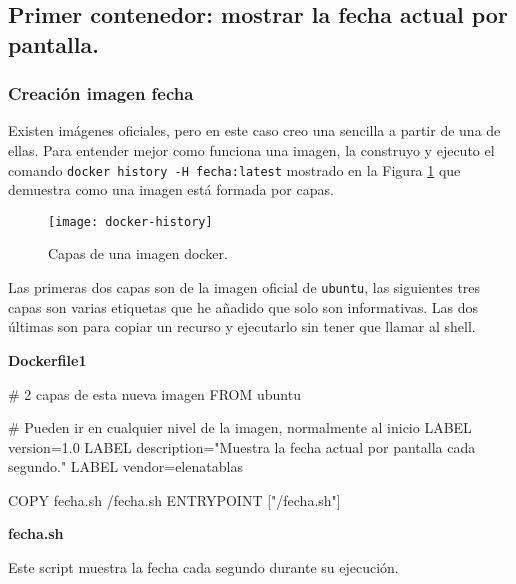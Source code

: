 
\subsection{Primer contenedor: mostrar la fecha actual por pantalla.}

\subsubsection{Creación imagen fecha}
\par Existen imágenes oficiales, pero en este caso creo una sencilla a partir de una de ellas.
Para entender mejor como funciona una imagen, la construyo 
y ejecuto el comando \texttt{docker history -H fecha:latest} mostrado en la
Figura \ref{fig:docker-histoy} que demuestra como una imagen está formada por capas.
\begin{figure}[H]
    \texttt{[image: docker-history]}
    \centering
    \caption{Capas de una imagen docker.}
    \label{fig:docker-histoy}
 \end{figure}
\par Las primeras dos capas son de la imagen oficial de \texttt{ubuntu}, las siguientes tres 
capas son varias etiquetas que he añadido que solo son informativas. Las dos últimas son 
para copiar un recurso y ejecutarlo sin tener que llamar al shell.
\par \textbf{Dockerfile1}
\begin{listing}
    # 2 capas de esta nueva imagen
    FROM ubuntu
    
    # Pueden ir en cualquier nivel de la imagen, normalmente al inicio
    LABEL version=1.0
    LABEL description="Muestra la fecha actual por pantalla cada segundo." 
    LABEL vendor=elenatablas
    
    COPY fecha.sh /fecha.sh
    ENTRYPOINT ["/fecha.sh"] 
\end{listing}

\par \textbf{fecha.sh}
\par Este script muestra la fecha cada segundo durante su ejecución.
